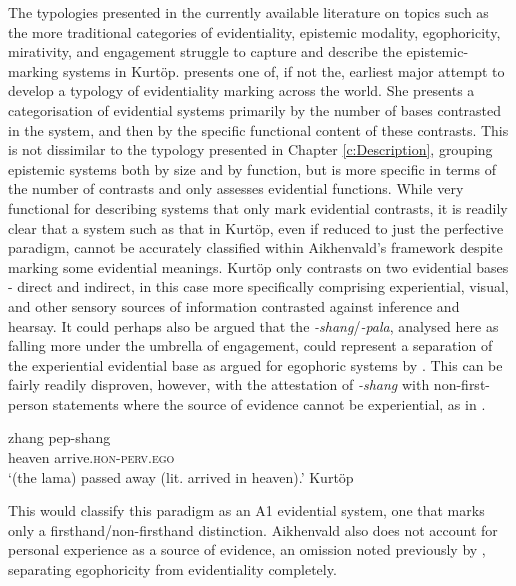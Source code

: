 The typologies presented in the currently available literature on topics such as the more traditional categories of evidentiality, epistemic modality, egophoricity, mirativity, and engagement struggle to capture and describe the epistemic-marking systems in Kurtöp.  presents one of, if not the, earliest major attempt to develop a typology of evidentiality marking across the world. She presents a categorisation of evidential systems primarily by the number of bases contrasted in the system, and then by the specific functional content of these contrasts. This is not dissimilar to the typology presented in Chapter \ref{c:Description}, grouping epistemic systems both by size and by function, but is more specific in terms of the number of contrasts and only assesses evidential functions. While very functional for describing systems that only mark evidential contrasts, it is readily clear that a system such as that in Kurtöp, even if reduced to just the perfective paradigm, cannot be accurately classified within Aikhenvald's framework despite marking some evidential meanings. Kurtöp only contrasts on two evidential bases - direct and indirect, in this case more specifically comprising experiential, visual, and other sensory sources of information contrasted against inference and hearsay. It could perhaps also be argued that the \textit{-shang}/\textit{-pala}, analysed here as falling more under the umbrella of engagement, could represent a separation of the experiential evidential base as argued for egophoric systems by . This can be fairly readily disproven, however, with the attestation of \textit{-shang} with non-first-person statements where the source of evidence cannot be experiential, as in .

\begin{exe}
    \ex\label{e:Discussion:KurtopShang}
    \gll zhang pep-shang \\
    heaven arrive.\textsc{hon-perv.ego} \\
    \glt `(the lama) passed away (lit. arrived in heaven).' Kurtöp \cite[East Bodish: Bhutan,][114]{Hyslop2014}
\end{exe}

This would classify this paradigm as an A1 evidential system, one that marks only a firsthand/non-firsthand distinction. Aikhenvald also does not account for personal experience as a source of evidence, an omission noted previously by , separating egophoricity from evidentiality completely.

